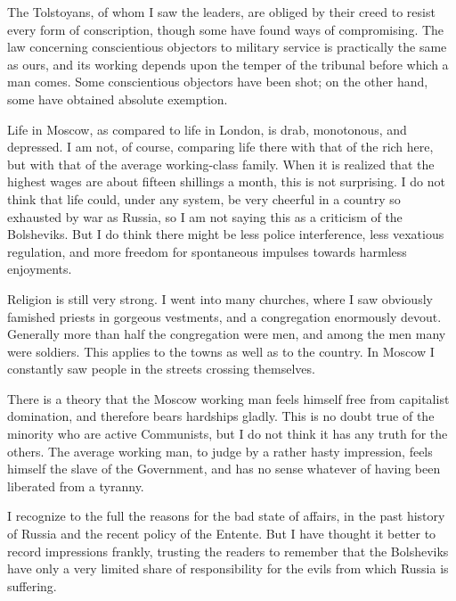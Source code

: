 The Tolstoyans, of whom I saw the leaders, are obliged by their creed to resist every form of conscription, though some have found ways of compromising. The law concerning conscientious objectors to military service is practically the same as ours, and its working depends upon the temper of the tribunal before which a man comes. Some conscientious objectors have been shot; on the other hand, some have obtained absolute exemption.

Life in Moscow, as compared to life in London, is drab, monotonous, and depressed. I am not, of course, comparing life there with that of the rich here, but with that of the average working-class family. When it is realized that the highest wages are about fifteen shillings a month, this is not surprising. I do not think that life could, under any system, be very cheerful in a country so exhausted by war as Russia, so I am not saying this as a criticism of the Bolsheviks. But I do think there might be less police interference, less vexatious regulation, and more freedom for spontaneous impulses towards harmless enjoyments.

Religion is still very strong. I went into many churches, where I saw obviously famished priests in gorgeous vestments, and a congregation enormously devout. Generally more than half the congregation were men, and among the men many were soldiers. This applies to the towns as well as to the country. In Moscow I constantly saw people in the streets crossing themselves.

There is a theory that the Moscow working man feels himself free from capitalist domination, and therefore bears hardships gladly. This is no doubt true of the minority who are active Communists, but I do not think it has any truth for the others. The average working man, to judge by a rather hasty impression, feels himself the slave of the Government, and has no sense whatever of having been liberated from a tyranny.

I recognize to the full the reasons for the bad state of affairs, in the past history of Russia and the recent policy of the Entente. But I have thought it better to record impressions frankly, trusting the readers to remember that the Bolsheviks have only a very limited share of responsibility for the evils from which Russia is suffering.